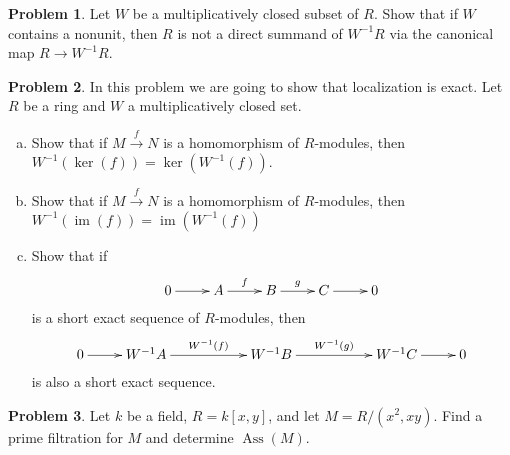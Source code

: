 \documentclass[11pt]{article}
\DeclareMathOperator{\Ass}{Ass}
\DeclareMathOperator{\im}{im}
\theoremstyle{definition}
\newtheorem{problem}{Problem}
\begin{document}
\vfill

\begin{problem}
	Let $W$ be a multiplicatively closed subset of $R$. Show that if $W$ contains a nonunit, then $R$ is not a direct summand of $W^{-1}R$ via the canonical map $R \to W^{-1}R$.
\end{problem}

\vfill

\begin{problem}
	In this problem we are going to show that localization is exact. Let $R$ be a ring and $W$ a multiplicatively closed set.
	\begin{enumerate}[a)]
		\item Show that if $M \xrightarrow{f} N$ is a homomorphism of $R$-modules, then $W^{-1}(\ker(f)) = \ker(W^{-1}(f))$. 
		\item Show that if $M \xrightarrow{f} N$ is a homomorphism of $R$-modules, then $W^{-1}(\im(f)) = \im(W^{-1}(f))$
		\item Show that if
		$$\xymatrix{0 \ar[r] & A \ar[r]^-{f} & B \ar[r]^-{g} & C \ar[r] & 0}$$ 
		is a short exact sequence of $R$-modules, then 
		$$\xymatrix{0 \ar[r] & W^{-1}A \ar[rr]^-{W^{-1}(f)} && W^{-1}B \ar[rr]^-{W^{-1}(g)} && W^{-1}C \ar[r] & 0}$$
		is also a short exact sequence.
	\end{enumerate}
\end{problem}

\vfill

\begin{problem}
	Let $k$ be a field, $R = k[x,y]$, and let $M = R/(x^2,xy)$. Find a prime filtration for $M$ and determine $\Ass(M)$.
\end{problem}
\end{document}
